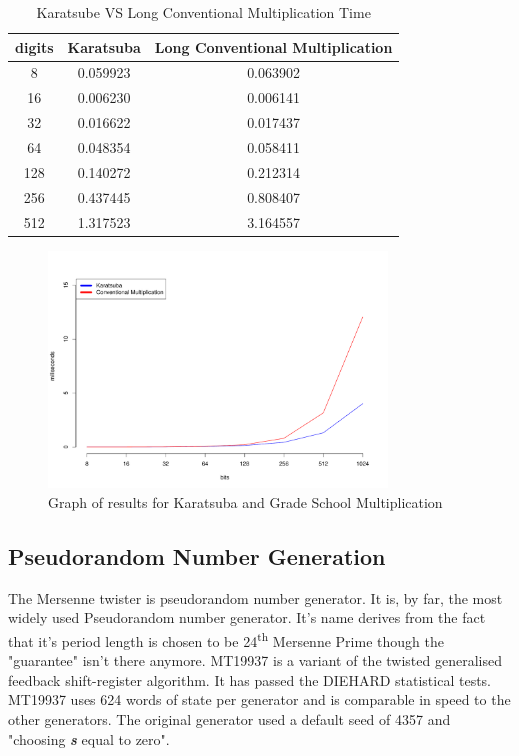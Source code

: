 \documentclass[12pt,journal,compsoc]{IEEEtran}
\begin{document}
\begin{table}[ht]
	\begin{center}
	\begin{tabular}{|c|c|c|}
    	\hline
       		digits 	&		Karatsuba					&	Long Conventional Multiplication\\
	\hline
    		8		&		0.059923					&	0.063902 \\
		16		&		0.006230					&	0.006141 \\
		32		&		0.016622					&	0.017437 \\
		64		&		0.048354					&	0.058411 \\
		128		&		0.140272					&	0.212314 \\
		256		&		0.437445					&	0.808407 \\
		512		&		1.317523					&	3.164557 \\
	\hline
	\end{tabular}
	\end{center}
	\caption{Karatsube VS Long Conventional Multiplication Time}
	\label{table:karatsubaVSgrade}

\end{table}

\begin{figure}[ht!]
\centering
\includegraphics[width=90mm]{images/karatsubaVSgradeSchool.pdf}
\caption{Graph of results for Karatsuba and Grade School Multiplication}
\label{fig:karatsubaVSgrade}
\end{figure}


\subsection{{Pseudorandom Number Generation}}
\label{sec:mersenne}
The Mersenne twister\cite{MT19937} is pseudorandom number generator. It is, by far, the most widely used Pseudorandom number generator. It's name derives from the fact that it's period length is chosen to be 24\textsuperscript{th} Mersenne Prime though the "guarantee" isn't there anymore. MT19937 is a variant of the twisted generalised feedback shift-register algorithm. It has passed the DIEHARD statistical tests. MT19937 uses 624 words of state per generator and is comparable in speed to the other generators. The original generator used a default seed of 4357 and "choosing \emph{{\bf s}} equal to zero".\cite{MT19937}
\end{document}
